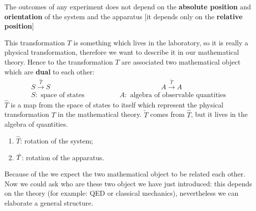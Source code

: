 \documentclass[../main.tex]{subfiles}
\begin{document}
\begin{assumption} The outcomes of any experiment does not depend on the \textbf{absolute position} and \textbf{orientation} of the system and the apparatus [it depends only on the \textbf{relative position}]
\end{assumption}
This transformation $T$ is something which lives in the laboratory, so it is really a physical transformation, therefore we want to describe it in our mathematical theory. Hence to the transformation $T$ are associated two mathematical object which are \textbf{dual} to each other:
\begin{align*}
    S \xrightarrow{\hat{T}} S \quad \qquad  \qquad & \qquad \qquad \qquad \qquad A \xrightarrow{\tilde{T}} A\\
    S: \textrm{ space of states } \qquad & \qquad A: \textrm{ algebra of observable quantities}
\end{align*}
$\hat{T}$ is a  map from the space of states to itself which represent the physical transformation $T$ in the mathematical theory. $\tilde{T}$ comes from $\hat{T}$, but it lives in the algebra of quantities.
\begin{enumerate}
    \item $\hat{T}$: rotation of the system;
    \item $\Tilde{T}$: rotation of the apparatus.
\end{enumerate}
Because of the  we expect the two mathematical object to be related each other. Now we could ask who are these two object we have just introduced: this depends on the theory (for example: QED or classical mechanics), nevertheless we can elaborate a general structure.
\end{document}
